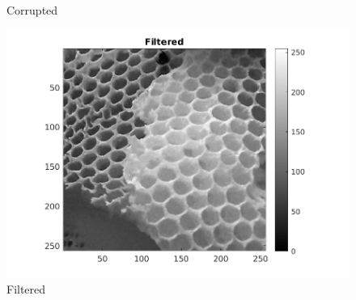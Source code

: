 \documentclass[12pt, a4paper]{article}
\begin{document}
\begin{figure}[h]
\begin{minipage}[c][1\width]{0.3\textwidth}
    	\caption{Corrupted}
	    \label{fig:3.4(b)}
    \end{minipage}
    \renewcommand{\thefigure}{3.4(c)}
    \begin{minipage}[c][1\width]{0.3\textwidth}
    	\includegraphics[width=1.5\textwidth]{Honeycomb_filtered.png}
    	\caption{Filtered}
	    \label{fig:3.4(c)}
    \end{minipage}
\end{figure}
\end{document}

